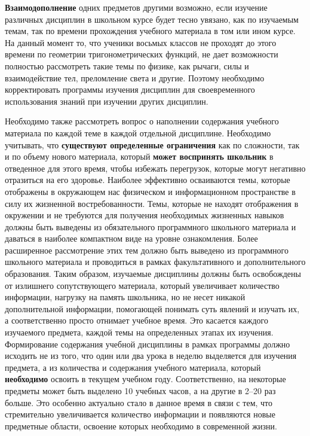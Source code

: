 \textbf{Взаимодополнение} одних предметов другими возможно, если изучение различных дисциплин в школьном курсе будет тесно увязано, как по изучаемым темам, так по времени прохождения учебного материала в том или ином курсе. На данный момент то, что ученики восьмых классов не проходят до этого времени по геометрии тригонометрических функций, не дает возможности полностью рассмотреть такие темы по физике, как рычаги, силы и взаимодействие тел, преломление света и другие. Поэтому необходимо корректировать программы изучения дисциплин для своевременного использования знаний при изучении других дисциплин. 

Необходимо также рассмотреть вопрос о наполнении содержания учебного материала по каждой теме в каждой отдельной дисциплине. Необходимо учитывать, что \textbf{существуют определенные ограничения} как по сложности, так и по объему нового материала, который \textbf{может воспринять школьник} в отведенное для этого время, чтобы избежать перегрузок, которые могут негативно отразиться на его здоровье. Наиболее эффективно осваиваются темы, которые отображены в окружающем нас физическом и информационном пространстве в силу их жизненной востребованности. Темы, которые не находят отображения в окружении и не требуются для получения необходимых жизненных навыков должны быть выведены из обязательного программного школьного материала и даваться в наиболее компактном виде на уровне ознакомления. Более расширенное рассмотрение этих тем должно быть выведено из программного школьного материала и проводиться в рамках факультативного и дополнительного образования. Таким образом, изучаемые дисциплины должны быть освобождены от излишнего сопутствующего материала, который увеличивает количество информации, нагрузку на память школьника, но не несет никакой дополнительной информации, помогающей понимать суть явлений и изучать их, а соответственно просто отнимает учебное время. Это касается каждого изучаемого предмета, каждой темы на определенных этапах их изучения. Формирование содержания учебной дисциплины в рамках программы должно исходить не из того, что один или два урока в неделю выделяется для изучения предмета, а из количества и содержания учебного материала, который \textbf{необходимо} освоить в текущем учебном году.  Соответственно, на некоторые предметы может быть выделено 10 учебных часов, а на другие в 2--20 раз больше. Это особенно актуально стало в данное время в связи с тем, что стремительно увеличивается количество информации и появляются новые предметные области, освоение которых необходимо в современной жизни.

